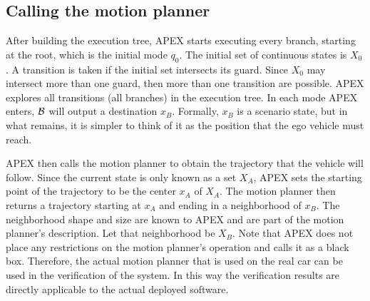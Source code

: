 \subsection{Calling the motion planner}
\label{sec:calling motion planner}


After building the execution tree, APEX starts executing every branch, starting at the root, which is the initial mode $q_0$.
The initial set of continuous states is $X_0$.
A transition is taken if the initial set intersects its guard.
Since $X_0$ may intersect more than one guard, then more than one transition are possible. 
APEX explores all transitions (all branches) in the execution tree.
In each mode APEX enters, $\mathcal{B}$ will output a destination $x_B$.
Formally, $x_B$ is a scenario state, but in what remains, it is simpler to think of it as the position that the ego vehicle must reach.

APEX then calls the motion planner to obtain the trajectory that the vehicle will follow.
Since the current state is only known as a set $X_A$, APEX sets the starting point of the trajectory to be the center $x_A$ of $X_A$.
The motion planner then returns a trajectory starting at $x_A$ and ending in a neighborhood of $x_B$.
The neighborhood shape and size are known to APEX and are part of the motion planner's description.
Let that neighborhood be $X_B$. Note that APEX does not place any restrictions on the motion planner's operation and calls it as a black box.
Therefore, the actual motion planner that is used on the real car can be used in the verification of the system.
In this way the verification results are directly applicable to the actual deployed software.